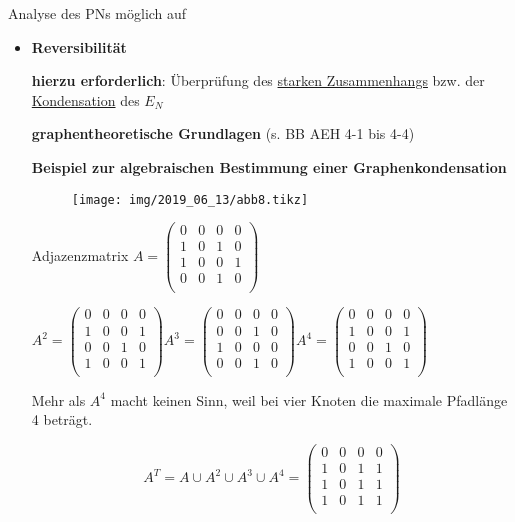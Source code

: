 Analyse des PNs möglich auf
\begin{itemize}
	\item{\textbf{Reversibilität}}  
	
	\textbf{hierzu erforderlich}: Überprüfung des \underline{starken Zusammenhangs} bzw. der \underline{Kondensation} des $E_N$
	
	\textbf{graphentheoretische Grundlagen} (s. BB AEH 4-1 bis 4-4)
	
	\textbf{Beispiel zur algebraischen Bestimmung einer Graphenkondensation}
	\begin{figure}[H]
		\centering
		\texttt{[image: img/2019\_06\_13/abb8.tikz]}
	\end{figure}
	
	Adjazenzmatrix $A = \left( \begin{array}{rrrr}
	0 & 0 & 0 & 0 \\
	1 & 0 & 1 & 0 \\
	1 & 0 & 0 & 1 \\
	0 & 0 & 1 & 0 \\
	\end{array}\right)$
	
	$
	A^{2} = \left( \begin{array}{rrrr}
	0 & 0 & 0 & 0 \\
	1 & 0 & 0 & 1 \\
	0 & 0 & 1 & 0 \\
	1 & 0 & 0 & 1 \\
	\end{array}\right)
	A^{3} = \left( \begin{array}{rrrr}
	0 & 0 & 0 & 0 \\
	0 & 0 & 1 & 0 \\
	1 & 0 & 0 & 0 \\
	0 & 0 & 1 & 0 \\
	\end{array}\right)
	A^{4} = \left( \begin{array}{rrrr}
	0 & 0 & 0 & 0 \\
	1 & 0 & 0 & 1 \\
	0 & 0 & 1 & 0 \\
	1 & 0 & 0 & 1 \\
	\end{array}\right)	
	 $

Mehr als $A^{4}$ macht keinen Sinn, weil bei vier Knoten die maximale Pfadlänge 4 beträgt.

\begin{equation}
	A^{T} = A \cup A^{2} \cup A^{3} \cup A^{4} = 
	\left( \begin{array}{rrrr}
	0 & 0 & 0 & 0 \\
	1 & 0 & 1 & 1 \\
	1 & 0 & 1 & 1 \\
	1 & 0 & 1 & 1 \\
	\end{array}\right)
\end{equation}


\end{itemize}
